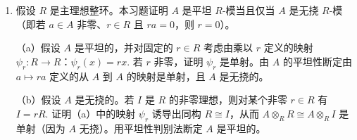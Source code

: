 \begin{enumerate}
（c）在（b）的假设下，设 \(L\) 与 \(M\) 是 \(R\)-模且 \(L \xrightarrow{\psi} M\) 是单射。证明 \(A \otimes_R L \to A \otimes_R M\) 是单射，并断定 \(A\) 是平坦的。〔把 \(M\) 写成自由模 \(F\) 的商，给出短正合列 \(0 \to K \to F \to M \to 0\). 令 \(J = \iota^{-1}(\psi(L))\)，\(J \hookrightarrow F\) 是自然含入，证明图
\[
\begin{array}{lllllll}
0 \longrightarrow & K & \longrightarrow & J & \longrightarrow & L & \longrightarrow 0\\
& \big\downarrow{\scriptstyle\mathrm{id}} & & \big\downarrow{\scriptstyle\iota} & & \big\downarrow{\scriptstyle\psi} & \\
0 \longrightarrow & K & \longrightarrow & F & \longrightarrow & M & \longrightarrow 0
\end{array}
\]
交换且各行正合。证明诱导出的图
\[
\begin{array}{lllllll}
& A \otimes_R K & \longrightarrow & A \otimes_R J & \longrightarrow & A \otimes_R L & \longrightarrow 0\\
& \big\downarrow{\scriptstyle\mathrm{id}} & & \big\downarrow{\scriptstyle 1 \otimes \iota} & & \big\downarrow{\scriptstyle 1 \otimes \psi} & \\
& A \otimes_R K & \longrightarrow & A \otimes_R F & \longrightarrow & A \otimes_R M & \longrightarrow 0
\end{array}
\]
交换且各行正合。用（b）证明 \(1 \otimes \iota\) 是单射，再用习题 1 断定 \(1 \otimes \psi\) 是单射。〕

（d）（\textbf{商模的平坦性判别法}）假设 \(A = F/K\)，其中 \(F\) 是平坦的（例如 \(F\) 自由），\(K\) 是 \(F\) 的 \(R\)-子模。证明 \(A\) 是平坦的当且仅当对 \(R\) 的每个有限生成理想 \(I\) 有 \(F \cap IK = K\).〔用（a）证明 \(F \otimes_R I \cong FI\)，并注意 \(K \otimes_R I\) 的像是 \(KI\)；把正合列 \(0 \to K \to F \to A \to 0\) 与 \(I\) 作张量，证明 \(A \otimes_R I \cong FI/KI\)，再应用平坦性判别法。〕

\item 假设 \(R\) 是主理想整环。本习题证明 \(A\) 是平坦 \(R\)-模当且仅当 \(A\) 是无挠 \(R\)-模（即若 \(a \in A\) 非零、\(r \in R\) 且 \(ra = 0\)，则 \(r = 0\)）。

（a）假设 \(A\) 是平坦的，并对固定的 \(r \in R\) 考虑由乘以 \(r\) 定义的映射 \(\psi_r : R \to R\)：\(\psi_r(x) = rx\). 若 \(r\) 非零，证明 \(\psi_r\) 是单射。由 \(A\) 的平坦性断定由 \(a \mapsto ra\) 定义的从 \(A\) 到 \(A\) 的映射是单射，且 \(A\) 是无挠的。

（b）假设 \(A\) 是无挠的。若 \(I\) 是 \(R\) 的非零理想，则对某个非零 \(r \in R\) 有 \(I = rR\). 证明（a）中的映射 \(\psi_r\) 诱导出同构 \(R \cong I\)，从而 \(A \otimes_R R \cong A \otimes_R I\) 是单射（因为 \(A\) 无挠）。用平坦性判别法断定 \(A\) 是平坦的。


\end{enumerate}
